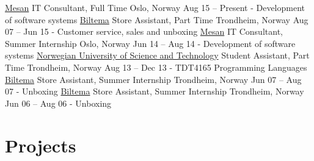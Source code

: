 \documentclass[print]{friggeri-cv}
\begin{document}
\begin{entrylist}
    \entryx
        {\href{http://mesan.no/}{Mesan}}
        {IT Consultant, Full Time}
        {Oslo, Norway}
        {Aug 15 – Present}
        {- Development of software systems}
    \entryspace
    \entryx
        {\href{http://biltema.no/}{Biltema}}
        {Store Assistant, Part Time}
        {Trondheim, Norway}
        {Aug 07 – Jun 15}
        {- Customer service, sales and unboxing}
    \entryspace
    \entryx
        {\href{http://mesan.no/}{Mesan}}
        {IT Consultant, Summer Internship}
        {Oslo, Norway}
        {Jun 14 – Aug 14}
        {- Development of software systems}
    \entryspace
    \entryx
        {\href{http://ntnu.no/}{Norwegian University of Science and Technology}}
        {Student Assistant, Part Time}
        {Trondheim, Norway}
        {Aug 13 – Dec 13}
        {- TDT4165 Programming Languages}
    \entryspace
    \entryx
        {\href{http://biltema.no/}{Biltema}}
        {Store Assistant, Summer Internship}
        {Trondheim, Norway}
        {Jun 07 – Aug 07}
        {- Unboxing}
    \entryspace
    \entryx
        {\href{http://biltema.no/}{Biltema}}
        {Store Assistant, Summer Internship}
        {Trondheim, Norway}
        {Jun 06 – Aug 06}
        {- Unboxing}
\end{entrylist}

\clearpage
\section{Projects}
\end{document}
